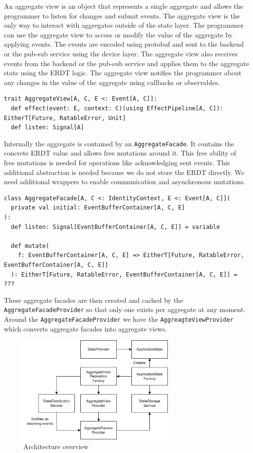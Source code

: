 \documentclass[
	english,
	ruledheaders=section,   %
	class=report,		    %
	thesis={type=bachelor}, %
	accentcolor=9c,			%
	custommargins=true,    %
	marginpar=false,        %
	parskip=half-,          %
	fontsize=11pt,          %
]{tudapub}
\begin{document}
An aggregate view is an object that represents a single aggregate and allows the programmer to listen for changes and submit events. The aggregate view is the only way to interact with aggregates outside of the state layer. The programmer can use the aggregate view to access or modify the value of the aggregate by applying events. The events are encoded using protobuf and sent to the backend or the pub-sub service using the device layer. The aggregate view also receives events from the backend or the pub-sub service and applies them to the aggregate state using the ERDT logic. The aggregate view notifies the programmer about any changes in the value of the aggregate using callbacks or observables.

\begin{lstlisting}
trait AggregateView[A, C, E <: Event[A, C]]:
  def effect(event: E, context: C)(using EffectPipeline[A, C]): EitherT[Future, RatableError, Unit]
  def listen: Signal[A]
\end{lstlisting}

Internally the aggregate is contained by an \texttt{AggregateFacade}. It contains the concrete ERDT value and allows free mutations around it. This free ability of free mutations is needed for operations like acknowledging sent events. This additional abstraction is needed because we do not store the ERDT directly. We need additional wrappers to enable communication and asynchronous mutations. 

\begin{lstlisting}
class AggregateFacade[A, C <: IdentityContext, E <: Event[A, C]](
  private val initial: EventBufferContainer[A, C, E]
):
  def listen: Signal[EventBufferContainer[A, C, E]] = variable

  def mutate(
    f: EventBufferContainer[A, C, E] => EitherT[Future, RatableError, EventBufferContainer[A, C, E]]
  ): EitherT[Future, RatableError, EventBufferContainer[A, C, E]] = ???

\end{lstlisting}

These aggregate facades are then created and cached by the \texttt{AggregateFacadeProvider} so that only one exists per aggregate at any moment. Around the \texttt{AggregateFacadeProvider} we have the \texttt{AggreagteViewProvider} which converts aggregate facades into aggregate views. 

\begin{figure}[h]
  \centering
  \includegraphics[width=0.7\textwidth]{state.png}
  \caption{Architecture overview}
\end{figure}
\end{document}
